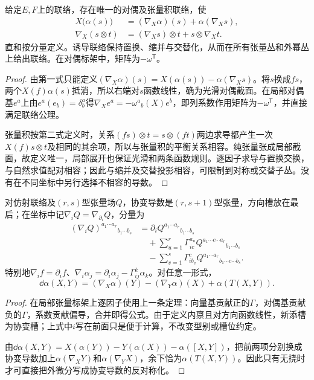\begin{theorem}[对偶、张量积及外幂联络]\label{thm:induced-connection}
给定$E,F$上的联络，存在唯一的对偶及张量积联络，使
\begin{align*}
 X\bigl(\alpha(s)\bigr)&=(\nabla_X\alpha)(s)+\alpha(\nabla_Xs),\\
 \nabla_X(s\otimes t)&=(\nabla_Xs)\otimes t+s\otimes\nabla_Xt.
\end{align*}
直和按分量定义。诱导联络保持置换、缩并与交替化，从而在所有张量丛和外幂丛上给出联络。在对偶标架中，矩阵为$-\omega^{\mathsf T}$。
\end{theorem}
\begin{proof}
由第一式只能定义$(\nabla_X\alpha)(s)=X(\alpha(s))-\alpha(\nabla_Xs)$。将$s$换成$fs$，两个$X(f)\alpha(s)$抵消，所以右端对$s$函数线性，确为光滑对偶截面。在局部对偶基$e^a$上由$e^a(e_b)=\delta^a_b$得$\nabla_Xe^a=-\omega^a{}_b(X)e^b$，即列系数作用矩阵为$-\omega^{\mathsf T}$，并直接满足联络公理。

张量积按第二式定义时，关系$(fs)\otimes t=s\otimes(ft)$两边求导都产生一次$X(f)s\otimes t$及相同的其余项，所以与张量积的平衡关系相容。纯张量张成局部截面，故定义唯一，局部展开也保证光滑和两条函数规则。逐因子求导与置换交换，与自然求值配对相容；因此与缩并及交替投影相容，可限制到对称或交替子丛。没有在不同坐标中另行选择不相容的导数。
\end{proof}

\begin{proposition}[混合张量的坐标公式]\label{prop:tensor-covariant-derivative}
对仿射联络及$(r,s)$型张量场$Q$，协变导数是$(r,s+1)$型张量，方向槽放在最后；在坐标中记$\nabla_iQ=\nabla_{\partial_i}Q$，分量为
\begin{align*}
 (\nabla_iQ)^{a_1\cdots a_r}{}_{b_1\cdots b_s}
 &=\partial_iQ^{a_1\cdots a_r}{}_{b_1\cdots b_s}\\
 &\quad+\sum_{u=1}^r\Gamma^{a_u}_{ic}
 Q^{a_1\cdots c\cdots a_r}{}_{b_1\cdots b_s}\\
 &\quad-\sum_{v=1}^s\Gamma^c_{ib_v}
 Q^{a_1\cdots a_r}{}_{b_1\cdots c\cdots b_s}.
\end{align*}
特别地$\nabla_if=\partial_if$、$\nabla_i\alpha_j=\partial_i\alpha_j-\Gamma^k_{ij}\alpha_k$。对任意一形式，
\[
 \dd\alpha(X,Y)=(\nabla_X\alpha)(Y)-(\nabla_Y\alpha)(X)+\alpha(T(X,Y)).
\]
\end{proposition}
\begin{proof}
在局部张量标架上逐因子使用上一条定理：向量基贡献正的$\Gamma$，对偶基贡献负的$\Gamma$，系数贡献偏导，合并即得公式。由于定义内禀且对方向函数线性，新添槽为协变槽；上式中$i$写在前面只是便于计算，不改变型别或槽位约定。

由$\dd\alpha(X,Y)=X(\alpha(Y))-Y(\alpha(X))-\alpha([X,Y])$，把前两项分别换成协变导数加上$\alpha(\nabla_XY)$和$\alpha(\nabla_YX)$，余下恰为$\alpha(T(X,Y))$。因此只有无挠时才可直接把外微分写成协变导数的反对称化。
\end{proof}

